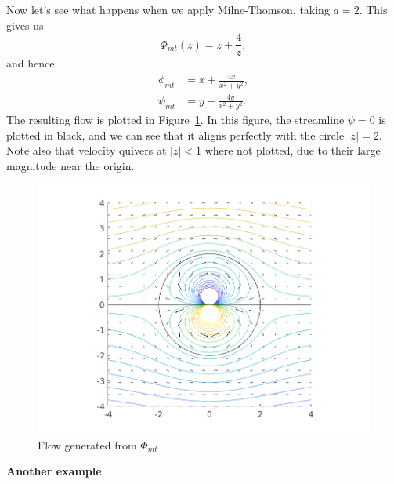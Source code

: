 \documentclass{article}
\begin{document}
Now let's see what happens when we apply Milne-Thomson, taking $a = 2$. This gives us
%
\begin{equation*}
    \Phi_{mt}(z) = z + \frac{4}{z}
    ,
\end{equation*}
%
and hence
%
\begin{align*}
    \phi_{mt} &= x + \frac{4 x}{x^2 + y^2}, \\
    \psi_{mt} &= y - \frac{4 y}{x^2 + y^2}
    .
\end{align*}
%
The resulting flow is plotted in Figure~\ref{fig:mt-2}. In this
figure, the streamline $\psi = 0$ is plotted in black, and we can
see that it aligns perfectly with the circle $|z| = 2$. Note also that
velocity quivers at $|z| < 1$ where not plotted, due to their large
magnitude near the origin.
%
\begin{figure}[ht]
    \includegraphics[width=35em]{mt_ex1_2}
    \centering
    \caption{Flow generated from $\Phi_{mt}$}
    \label{fig:mt-2}
\end{figure}

\textbf{Another example}
\end{document}
